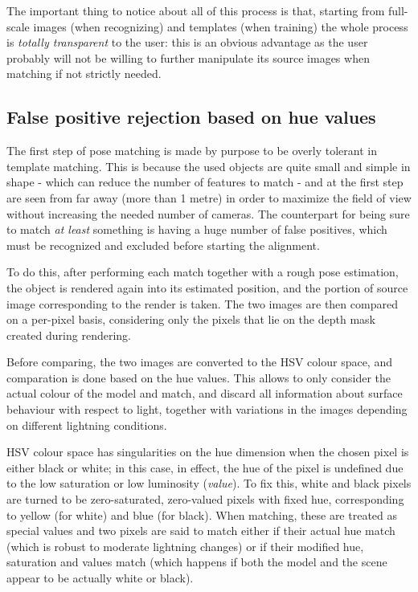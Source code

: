 The important thing to notice about all of this process is that,
starting from full-scale images (when recognizing) and templates (when
training) the whole process is \emph{totally transparent} to the user:
this is an obvious advantage as the user probably will not be willing
to further manipulate its source images when matching if not strictly needed.

\subsection{False positive rejection based on hue values}
The first step of pose matching is made by purpose to be overly tolerant in
template matching. This is because the used objects are quite small and simple
in shape - which can reduce the number of features to match - and at the first
step are seen from far away (more than 1 metre) in order to maximize the
field of view without increasing the needed number of cameras. The counterpart
for being sure to match \emph{at least} something is having a huge number of
  false positives, which must be recognized and excluded before starting the
  alignment.


To do this, after performing each match together with a rough pose estimation,
the object is rendered again into its estimated position, and the portion of
source image corresponding to the render is taken. The two images are then
compared on a per-pixel basis, considering only the pixels that lie on the
depth mask created during rendering. 

Before comparing, the two images are converted to the HSV colour space, and
comparation is done based on the hue values. This allows to only consider the
actual colour of the model and match, and discard all information about
surface behaviour with respect to light, together with variations in the images
depending on different lightning conditions.

HSV colour space has singularities on the hue dimension when the chosen pixel is
either black or white; in this case, in effect, the hue of the pixel is
undefined due to the low saturation or low luminosity (\emph{value}). To fix
this, white and black pixels are turned to be zero-saturated, zero-valued
pixels with fixed hue, corresponding to yellow (for white) and blue (for
black). When matching, these are treated as special values and two pixels are
said to match either if their actual hue match (which
is robust to moderate lightning changes) or if their modified hue, saturation
and values match
(which happens if both the model and the scene appear to be actually white or
black). 

